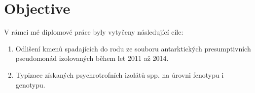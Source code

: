 \chapter*{Objective}

V rámci mé diplomové práce byly vytyčeny následující cíle:

\begin{enumerate}
\item Odlišení kmenů spadajících do rodu  ze souboru antarktických presumptivních pseudomonád izolovaných během let 2011 až 2014.

\item Typizace získaných psychrotrofních izolátů  spp. na úrovni fenotypu i genotypu.


\end{enumerate}



\shorthandon{-} 
